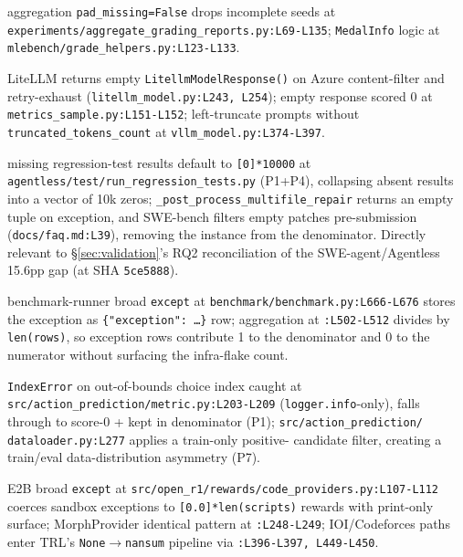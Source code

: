 \documentclass{article}
\begin{document}
\begin{description}[leftmargin=0pt,itemindent=0pt,labelindent=0pt,labelsep=0.4em,itemsep=2pt,topsep=2pt,parsep=0pt,font=\normalfont\bfseries]
\item[MLE-bench:] aggregation \texttt{pad\_missing=False}
drops incomplete seeds at
\texttt{experiments/aggregate\_grading\_reports.py:L69-L135};
\texttt{MedalInfo} logic at
\texttt{mlebench/grade\_helpers.py:L123-L133}.

\item[lighteval:] LiteLLM returns empty
\texttt{LitellmModel}\allowbreak\texttt{Response()} on Azure
content-filter and retry-exhaust
(\texttt{litellm\_model.py:L243, L254}); empty response scored 0
at \texttt{metrics\_sample.py:L151-L152}; left-truncate prompts
without \texttt{truncated\_}\allowbreak\texttt{tokens\_count} at
\texttt{vllm\_model.py:L374-L397}.

\item[Agentless:] missing regression-test results default to
\texttt{[0]{*}10000} at
\texttt{agentless/test/run\_regression\_tests.py} (P1+P4),
collapsing absent results into a vector of 10k zeros;
\texttt{\_post\_process\_multifile\_repair} returns an empty
tuple on exception, and SWE-bench filters empty patches
pre-submission (\texttt{docs/faq.md:L39}), removing the
instance from the denominator. Directly relevant to
\S\ref{sec:validation}'s RQ2 reconciliation of the
SWE-agent/Agentless 15.6pp gap (at SHA \texttt{5ce5888}).

\item[aider:] benchmark-runner broad \texttt{except} at
\texttt{benchmark/benchmark.py:L666-L676} stores the exception
as \texttt{\{"exception": \ldots\}} row; aggregation at
\texttt{:L502-L512} divides by \texttt{len(rows)}, so
exception rows contribute 1 to the denominator and 0 to the
numerator without surfacing the infra-flake count.

\item[Mind2Web:] \texttt{IndexError} on out-of-bounds choice
index caught at
\texttt{src/action\_prediction/metric.py:L203-L209}
(\texttt{logger.info}-only), falls through to score-0 + kept in
denominator (P1); \texttt{src/action\_prediction/}%
\texttt{dataloader.py:L277} applies a train-only positive-%
candidate filter, creating a train/eval data-distribution
asymmetry (P7).

\item[open-r1:] E2B broad \texttt{except} at
\texttt{src/open\_r1/rewards/code\_providers.py:L107-L112}
coerces sandbox exceptions to \texttt{[0.0]{*}len(scripts)}
rewards with print-only surface; MorphProvider identical
pattern at \texttt{:L248-L249}; IOI/Codeforces paths enter
TRL's \texttt{None}$\to$\texttt{nansum} pipeline via
\texttt{:L396-L397, L449-L450}.


\end{description}
\end{document}
